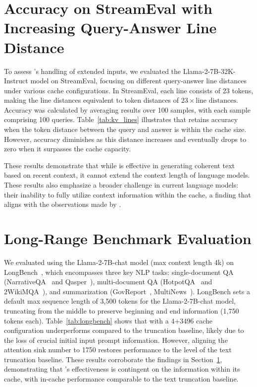 \section{Accuracy on StreamEval with Increasing Query-Answer Line Distance}
\label{sec:kv_lines}

To assess \method's handling of extended inputs, we evaluated the Llama-2-7B-32K-Instruct model on StreamEval, focusing on different query-answer line distances under various cache configurations. In StreamEval, each line consists of 23 tokens, making the line distances equivalent to token distances of $23 \times \text{line distances}$. Accuracy was calculated by averaging results over 100 samples, with each sample comprising 100 queries. Table~\ref{tab:kv_lines} illustrates that \method retains accuracy when the token distance between the query and answer is within the cache size. However, accuracy diminishes as this distance increases and eventually drops to zero when it surpasses the cache capacity.

These results demonstrate that while \method is effective in generating coherent text based on recent context, it cannot extend the context length of language models. These results also emphasize a broader challenge in current language models: their inability to fully utilize context information within the cache, a finding that aligns with the observations made by \citeauthor{liu2023lost}.

\section{Long-Range Benchmark Evaluation}

We evaluated \method using the Llama-2-7B-chat model (max context length 4k) on LongBench~\citep{bai2023longbench}, which encompasses three key NLP tasks: single-document QA (NarrativeQA~\citep{narrativeqa} and Qasper~\citep{dasigi2021qasper}), multi-document QA (HotpotQA~\citep{yang2018hotpotqa} and 2WikiMQA~\cite{ho-etal-2020-constructing}), and summarization (GovReport~\citep{huang2021govreport}, MultiNews~\citep{fabbri2019multinews}). LongBench sets a default max sequence length of 3,500 tokens for the Llama-2-7B-chat model, truncating from the middle to preserve beginning and end information (1,750 tokens each). Table~\ref{tab:longbench} shows that \method with a 4+3496 cache configuration underperforms compared to the truncation baseline, likely due to the loss of crucial initial input prompt information. However, aligning the attention sink number to 1750 restores performance to the level of the text truncation baseline. These results corroborate the findings in Section~\ref{sec:kv_lines}, demonstrating that \method's effectiveness is contingent on the information within its cache, with in-cache performance comparable to the text truncation baseline.

